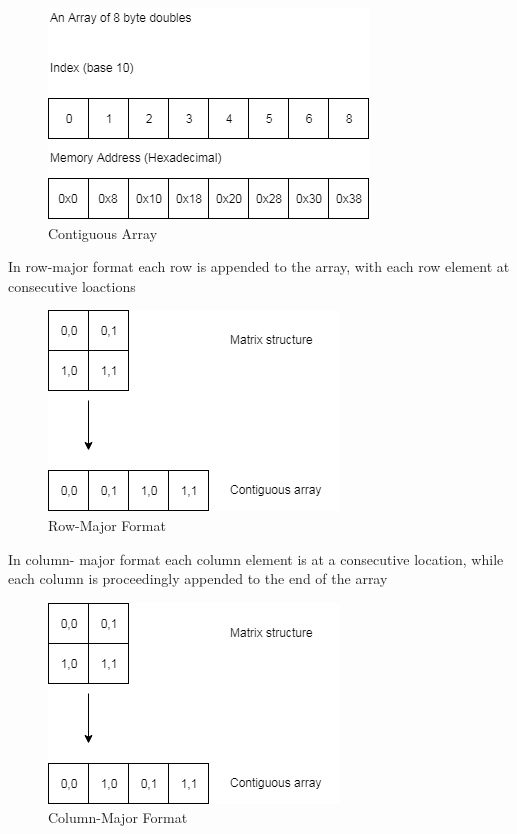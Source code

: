 \documentclass[a4paper]{amsart}
\begin{document}
\begin{figure}[h]
\centering
\includegraphics[scale=0.5]{ContiguousArray1.png}
\caption {Contiguous Array}
\label {fig:cont}
\end{figure}

In row-major format each row is appended to the array, with each row element at consecutive loactions

\begin{figure}[h]
\centering
\includegraphics[scale=0.5]{RowMajorFormat1.png}
\caption {Row-Major Format}
\label {fig:rowmajor}
\end{figure}


In column- major format each column element is at a consecutive location, while each column is proceedingly appended to the end of the array

\begin{figure}[h]
\centering
\includegraphics[scale=0.5]{ColumnMajorFormat1.png}
\caption {Column-Major Format}
\label {fig:colmajor}
\end{figure}
\end{document}
